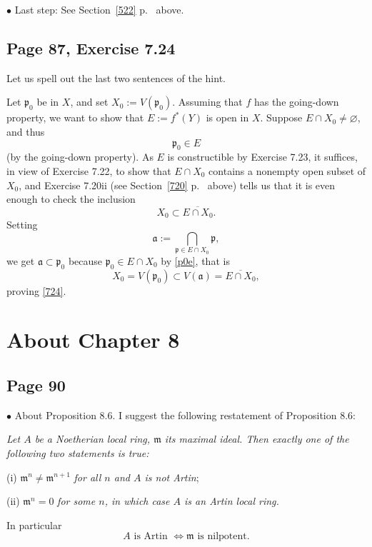 \documentclass[parskip=half,fontsize=12pt]{scrartcl}%
\newcommand{\mf}{\mathfrak}
\newcommand{\aaa}{\mf a}
\newcommand{\mmm}{\mf m}
\newcommand{\ppp}{\mf p}
\newcommand{\bu}{\bullet}
\begin{document}
$\bu$ Last step: See Section~\ref{522} p.~\pageref{522} above.

\subsection{Page 87, Exercise 7.24}%

Let us spell out the last two sentences of the hint.

Let $\ppp_0$ be in $X$, and set $X_0:=V(\ppp_0)$. Assuming that $f$ has the going-down property, we want to show that $E:=f^*(Y)$ is open in $X$. Suppose $E\cap X_0\ne\varnothing$, and thus 
\begin{equation}\label{p0e}
\ppp_0\in E
\end{equation} 
(by the going-down property). As $E$ is constructible by Exercise 7.23, it suffices, in view of Exercise 7.22, to show that $E\cap X_0$ contains a nonempty open subset of $X_0$, and Exercise 7.20ii (see Section~\ref{720} p.~\pageref{720} above) tells us that it is even enough to check the inclusion 
\begin{equation}\label{724}
X_0\subset\overline{E\cap X_0}.
\end{equation} 
Setting 
$$
\aaa:=\bigcap_{\ppp\in E\cap X_0}\ppp,
$$ 
we get $\aaa\subset\ppp_0$ because $\ppp_0\in E\cap X_0$ by \eqref{p0e}, that is 
$$
X_0=V(\ppp_0)\subset V(\aaa)=\overline{E\cap X_0},
$$ 
proving \eqref{724}.

\section{About Chapter 8}%

\subsection{Page 90}\label{90}%

$\bu$ About Proposition 8.6. I suggest the following restatement of Proposition 8.6:

\emph{Let $A$ be a Noetherian local ring, $\mmm$ its maximal ideal. Then exactly one of the following two statements is true:}

(i) $\mmm^n\ne\mmm^{n+1}$ \emph{for all $n$ and $A$ is \emph{not} Artin};

(ii) $\mmm^n=0$ \emph{for some $n$, in which case $A$ is an Artin local ring.}

In particular 
\begin{equation}\label{86}
A\text{ is Artin $\iff\mmm$ is nilpotent.}
\end{equation}%
\end{document}
